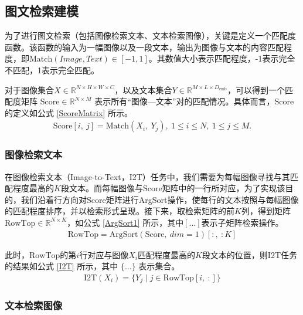 \documentclass[a4paper]{zreport}
\begin{document}
\subsection{图文检索建模}

为了进行图文检索（包括图像检索文本、文本检索图像），关键是定义一个匹配度函数。该函数的输入为一幅图像以及一段文本，输出为图像与文本的内容匹配程度，即$\mathrm{Match}\left(Image, Text\right) \in \left[-1, 1\right]$。其数值大小表示匹配程度，-1表示完全不匹配，1表示完全匹配。

对于图像集合$X \in \mathbb{R}^{N \times H \times W \times C}$，以及文本集合$Y \in \mathbb{R}^{M \times L \times D_\mathrm{emb}}$，可以得到一个匹配度矩阵 $\mathrm{Score} \in \mathbb{R}^{N \times M}$ 表示所有“图像—文本”对的匹配情况。具体而言，$\mathrm{Score}$的定义如公式 \eqref{ScoreMatrix} 所示。
\begin{gather}
\mathrm{Score}\left[i,~j\right] = \mathrm{Match}\left(X_i,~Y_j\right),~1\le i \le N,~1\le j \le M.\label{ScoreMatrix}
\end{gather}

\subsubsection{图像检索文本}

在图像检索文本（Image-to-Text，I2T）任务中，我们需要为每幅图像寻找与其匹配程度最高的$K$段文本。而每幅图像与$\mathrm{Score}$矩阵中的一行所对应，为了实现该目的，我们沿着行方向对$\mathrm{Score}$矩阵进行ArgSort操作，使每行的文本按照与每幅图像的匹配程度排序，并以检索形式呈现。接下来，取检索矩阵的前$K$列，得到矩阵$\mathrm{RowTop} \in \mathbb{R}^{N \times K}$，如公式 \eqref{ArgSort1} 所示，其中$\left[...\right]$表示子矩阵检索操作。
\begin{gather}
\mathrm{RowTop} = \mathrm{ArgSort}\left(\mathrm{Score},~dim=1\right)\left[:,~:K\right]
\label{ArgSort1}
\end{gather}

此时，$\mathrm{RowTop}$的第$i$行对应与图像$X_i$匹配程度最高的$K$段文本的位置，则I2T任务的结果如公式 \eqref{I2T} 所示，其中 $\{...\}$ 表示集合。
\begin{gather}
\mathrm{I2T}\left(X_i\right) = \{Y_j\mid j \in \mathrm{RowTop}\left[i,~:\right]\}\label{I2T}
\end{gather}

\subsubsection{文本检索图像}
\end{document}
